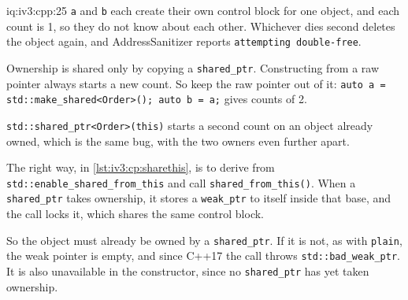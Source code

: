 \begin{solution}{iq:iv3:cpp:25}
\texttt{a} and \texttt{b} each create their own control block for one object, and each count is 1, so they do not know about each other. Whichever dies second deletes the object again, and AddressSanitizer reports \texttt{attempting double-free}.

Ownership is shared only by copying a \texttt{shared\_ptr}. Constructing from a raw pointer always starts a new count. So keep the raw pointer out of it: \texttt{auto a = std::make\_shared<Order>(); auto b = a;} gives counts of 2.

\texttt{std::shared\_ptr<Order>(this)} starts a second count on an object already owned, which is the same bug, with the two owners even further apart.

The right way, in \cref{lst:iv3:cp:sharethis}, is to derive from \texttt{std::enable\_shared\_from\_this} and call \texttt{shared\_from\_this()}. When a \texttt{shared\_ptr} takes ownership, it stores a \texttt{weak\_ptr} to itself inside that base, and the call locks it, which shares the same control block.
\enlargethispage{-3\baselineskip}%
\label{lst:iv3:cp:sharethis}

So the object must already be owned by a \texttt{shared\_ptr}. If it is not, as with \texttt{plain}, the weak pointer is empty, and since C++17 the call throws \texttt{std::bad\_weak\_ptr}. It is also unavailable in the constructor, since no \texttt{shared\_ptr} has yet taken ownership.

\end{solution}

